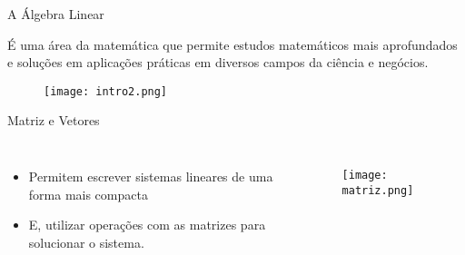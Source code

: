 \begin{frame}[t]{A Álgebra Linear} 

 É uma área da matemática que permite estudos matemáticos mais aprofundados e soluções em aplicações práticas em diversos campos da ciência e negócios.
 \nocite{baldin2011geometria}\nocite{boldrini1980algebra}\nocite{craig2012robotica}

 \vspace*{0.8cm}

\begin{figure}
    \texttt{[image: intro2.png]}
\end{figure}
            
\end{frame}

\begin{frame}[t]{Matriz e Vetores} 
    \begin{columns}
        \begin{itemize}
            \item Permitem escrever sistemas lineares de uma forma mais compacta
            \item E, utilizar operações com as matrizes para solucionar o sistema.
        \end{itemize}
        \begin{figure}
            \texttt{[image: matriz.png]}
        \end{figure}
    \end{columns}
\end{frame}
